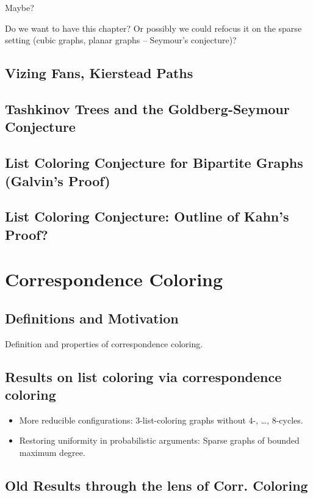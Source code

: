 \documentclass[12pt,twoside,openright,a4paper]{book}
\begin{document}
Maybe?

Do we want to have this chapter?  Or possibly we could refocus it on the
sparse setting (cubic graphs, planar graphs -- Seymour's conjecture)?

\section{Vizing Fans, Kierstead Paths}
\section{Tashkinov Trees and the Goldberg-Seymour Conjecture}\label{sec:goseycon}
\section{List Coloring Conjecture for Bipartite Graphs (Galvin's Proof)}
\section{List Coloring Conjecture: Outline of Kahn's Proof?}

\chapter{Correspondence Coloring}\label{chap:corresp}


\section{Definitions and Motivation}

Definition and properties of correspondence coloring.

\section{Results on list coloring via correspondence coloring}

\begin{itemize}
\item More reducible configurations: $3$-list-coloring graphs without $4$-, \ldots, $8$-cycles.
\item Restoring uniformity in probabilistic arguments: Sparse graphs of bounded maximum degree.
\end{itemize}

\section{Old Results through the lens of Corr. Coloring}
\end{document}

